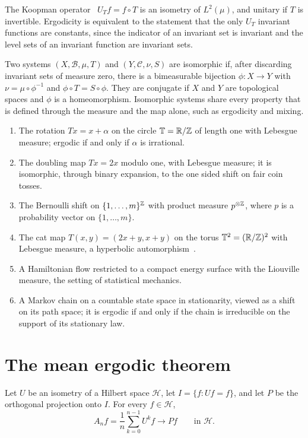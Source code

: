 The Koopman operator~\cite{koopman1931} $U_Tf = f\circ T$ is an isometry of $L^2(\mu)$, and unitary if $T$ is invertible. Ergodicity is equivalent to the statement that the only $U_T$ invariant functions are constants, since the indicator of an invariant set is invariant and the level sets of an invariant function are invariant sets.

Two systems $(X,\mathcal{B},\mu,T)$ and $(Y,\mathcal{C},\nu,S)$ are isomorphic if, after discarding invariant sets of measure zero, there is a bimeasurable bijection $\phi:X\to Y$ with $\nu = \mu\circ\phi^{-1}$ and $\phi\circ T = S\circ\phi$. They are conjugate if $X$ and $Y$ are topological spaces and $\phi$ is a homeomorphism. Isomorphic systems share every property that is defined through the measure and the map alone, such as ergodicity and mixing.

\begin{example}
\begin{enumerate}
\item The rotation $Tx = x+\alpha$ on the circle $\mathbb{T} = \mathbb{R}/\mathbb{Z}$ of length one with Lebesgue measure; ergodic if and only if $\alpha$ is irrational.
\item The doubling map $Tx = 2x$ modulo one, with Lebesgue measure; it is isomorphic, through binary expansion, to the one sided shift on fair coin tosses.
\item The Bernoulli shift on $\{1,\dots,m\}^{\mathbb{Z}}$ with product measure $p^{\otimes\mathbb{Z}}$, where $p$ is a probability vector on $\{1,\dots,m\}$.
\item The cat map $T(x,y) = (2x+y,x+y)$ on the torus $\mathbb{T}^2 = (\mathbb{R}/\mathbb{Z})^2$ with Lebesgue measure, a hyperbolic automorphism~\cite{arnoldavez1968}.
\item A Hamiltonian flow restricted to a compact energy surface with the Liouville measure, the setting of statistical mechanics.
\item A Markov chain on a countable state space in stationarity, viewed as a shift on its path space; it is ergodic if and only if the chain is irreducible on the support of its stationary law.
\end{enumerate}
\end{example}

\section{The mean ergodic theorem}

\begin{theorem}
\label{thm:vonneumann}
Let $U$ be an isometry of a Hilbert space $\mathcal{H}$, let $I = \{f:Uf = f\}$, and let $P$ be the orthogonal projection onto $I$. For every $f\in\mathcal{H}$,
\[
A_nf = \frac1n\sum_{k=0}^{n-1}U^kf\longrightarrow Pf\qquad\text{in }\mathcal{H}.
\]
\end{theorem}

